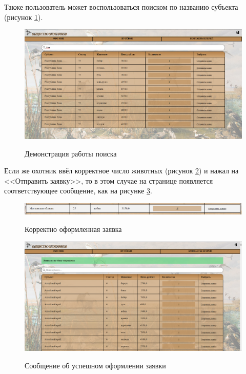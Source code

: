 	Также пользователь может воспользоваться поиском по названию субъекта (рисунок \ref{fig14:image}).
	
	\begin{figure}[h]
		\centering
		\begin{center}
			{\includegraphics[scale=0.3245]{schemes/screens/find.png}}
			\caption{Демонстрация работы поиска}
			\label{fig14:image}
		\end{center}
	\end{figure}
	\newpage

	Если же охотник ввёл корректное число животных (рисунок \ref{fig15:image}) и нажал на <<Отправить заявку>>, то в этом случае на странице появляется соответствующее сообщение, как на рисунке \ref{fig16:image}.
	
	\begin{figure}[h]
		\centering
		\begin{center}
			{\includegraphics[scale=0.34]{schemes/screens/right_data.png}}
			\caption{Корректно оформленная заявка}
			\label{fig15:image}
		\end{center}
	\end{figure}

	\begin{figure}[h]
		\centering
		\begin{center}
			{\includegraphics[scale=0.34]{schemes/screens/msg_right.png}}
			\caption{Сообщение об успешном оформлении заявки}
			\label{fig16:image}
		\end{center}
	\end{figure}

